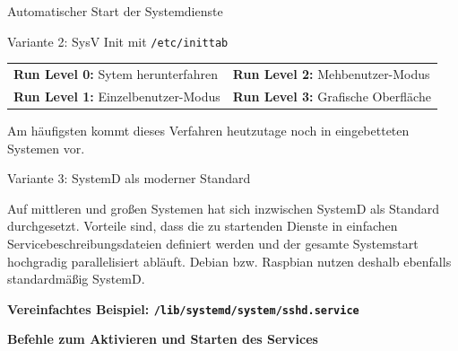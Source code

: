 {\begin{frame}[allowframebreaks]{Automatischer Start der Systemdienste}
\begin{block}{Variante 2: SysV Init mit \texttt{/etc/inittab}}
        \vfill
        \begin{center}
            \scriptsize
            \begin{tabularx}{.8\textwidth}{X X}
                    \textbf{Run Level 0:} Sytem herunterfahren &
                    \textbf{Run Level 2:} Mehbenutzer-Modus \\

                    \textbf{Run Level 1:} Einzelbenutzer-Modus &
                    \textbf{Run Level 3:} Grafische Oberfläche \\
            \end{tabularx}
        \end{center}

        \vfill
        \parbox{\linewidth}{
            Am häufigsten kommt dieses Verfahren heutzutage noch in eingebetteten Systemen vor.
        }

        \vfill
        
    \end{block}

    \framebreak

    \begin{block}{Variante 3: SystemD als moderner Standard}
        \smallskip
        \parbox{\linewidth}{
            Auf mittleren und großen Systemen hat sich inzwischen SystemD als Standard
            durchgesetzt. Vorteile sind, dass die zu startenden Dienste in einfachen
            Servicebeschreibungsdateien definiert werden und der gesamte Systemstart
            hochgradig parallelisiert abläuft. Debian bzw. Raspbian nutzen deshalb
            ebenfalls standardmäßig SystemD.
        }

        \bigskip
        \textbf{Vereinfachtes Beispiel: \texttt{/lib/systemd/system/sshd.service}}
        

        \smallskip
        \textbf{Befehle zum Aktivieren und Starten des Services}
        
    \end{block}
\end{frame}
}

